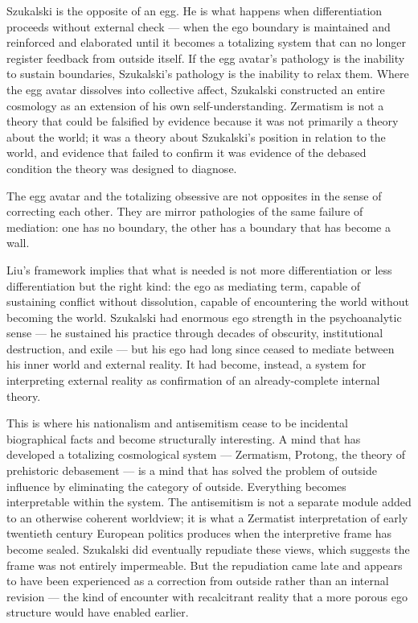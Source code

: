 \documentclass[11pt, a4paper]{article}
\theoremstyle{named}
\begin{document}
Szukalski is the opposite of an egg. He is what happens when
differentiation proceeds without external check — when the ego boundary
is maintained and reinforced and elaborated until it becomes a
totalizing system that can no longer register feedback from outside
itself. If the egg avatar's pathology is the inability to sustain
boundaries, Szukalski's pathology is the inability to relax them.
Where the egg avatar dissolves into collective affect, Szukalski
constructed an entire cosmology as an extension of his own
self-understanding. Zermatism is not a theory that could be falsified
by evidence because it was not primarily a theory about the world; it
was a theory about Szukalski's position in relation to the world, and
evidence that failed to confirm it was evidence of the debased
condition the theory was designed to diagnose.

\begin{keybox}
The egg avatar and the totalizing obsessive are not opposites in the
sense of correcting each other. They are mirror pathologies of the
same failure of mediation: one has no boundary, the other has a
boundary that has become a wall.
\end{keybox}

Liu's framework implies that what is needed is not more differentiation
or less differentiation but the right kind: the ego as mediating term,
capable of sustaining conflict without dissolution, capable of
encountering the world without becoming the world. Szukalski had
enormous ego strength in the psychoanalytic sense — he sustained his
practice through decades of obscurity, institutional destruction, and
exile — but his ego had long since ceased to mediate between his inner
world and external reality. It had become, instead, a system for
interpreting external reality as confirmation of an already-complete
internal theory.

This is where his nationalism and antisemitism cease to be incidental
biographical facts and become structurally interesting. A mind that
has developed a totalizing cosmological system — Zermatism, Protong,
the theory of prehistoric debasement — is a mind that has solved the
problem of outside influence by eliminating the category of outside.
Everything becomes interpretable within the system. The antisemitism
is not a separate module added to an otherwise coherent worldview; it
is what a Zermatist interpretation of early twentieth century European
politics produces when the interpretive frame has become sealed.
Szukalski did eventually repudiate these views, which suggests the
frame was not entirely impermeable. But the repudiation came late
and appears to have been experienced as a correction from outside
rather than an internal revision — the kind of encounter with
recalcitrant reality that a more porous ego structure would have
enabled earlier.
\end{document}
